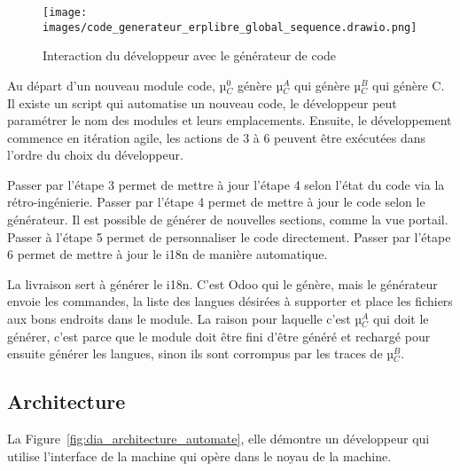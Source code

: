 \begin{figure}[htb]
\centering
\texttt{[image: images/code\_generateur\_erplibre\_global\_sequence.drawio.png]}
\caption{Interaction du développeur avec le générateur de code}
\label{fig:dia_sequence_gc}
\end{figure}

Au départ d’un nouveau module code, µ$_C^0$ génère µ$_C^A$ qui génère µ$_C^B$ qui génère C. Il existe un script qui automatise un nouveau code, le développeur peut paramétrer le nom des modules et leurs emplacements. Ensuite, le développement commence en itération agile, les actions de 3 à 6 peuvent être exécutées dans l’ordre du choix du développeur.


Passer par l’étape 3 permet de mettre à jour l’étape 4 selon l’état du code via la rétro-ingénierie. Passer par l’étape 4 permet de mettre à jour le code selon le générateur. Il est possible de générer de nouvelles sections, comme la vue portail. Passer à l’étape 5 permet de personnaliser le code directement. Passer par l’étape 6 permet de mettre à jour le i18n de manière automatique.

La livraison sert à générer le i18n. C’est Odoo qui le génère, mais le générateur envoie les commandes, la liste des langues désirées à supporter et place les fichiers aux bons endroits dans le module. La raison pour laquelle c’est µ$_C^A$ qui doit le générer, c’est parce que le module doit être fini d’être généré et rechargé pour ensuite générer les langues, sinon ils sont corrompus par les traces de µ$_C^B$.


\subsection{Architecture}\label{architecture_result}

La Figure~\ref{fig:dia_architecture_automate}, elle démontre un développeur qui utilise l'interface de la machine qui opère dans le noyau de la machine.

